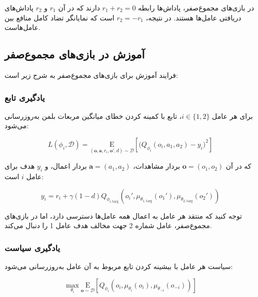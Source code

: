 در بازی‌های مجموع­‌صفر، پاداش‌ها رابطه $r_1 + r_2 = 0$ دارند که در آن $r_1$ و $r_2$ پاداش‌های دریافتی عامل‌ها هستند. در نتیجه، $r_2 = -r_1$ است که نمایانگر تضاد کامل منافع بین عامل‌هاست.

\subsection{آموزش  در بازی‌های مجموع­‌صفر}

فرایند آموزش  برای بازی‌های مجموع­‌صفر به شرح زیر است:

\subsubsection{یادگیری تابع }

برای هر عامل $i \in \{1, 2\}$، تابع  با کمینه کردن خطای میانگین مربعات بلمن به‌روزرسانی می‌شود:

\begin{equation}
    L(\phi_i, \mathcal{D}) = \underset{(\boldsymbol{o}, \boldsymbol{a}, r_i, \boldsymbol{o}', d) \sim \mathcal{D}}{\mathrm{E}}\left[ 
    \Bigg( Q_{\phi_i}(o_i, a_1, a_2) - y_i \Bigg)^2
    \right]
\end{equation}

که در آن $\boldsymbol{o} = (o_1, o_2)$ بردار مشاهدات، $\boldsymbol{a} = (a_1, a_2)$ بردار اعمال، و $y_i$ هدف برای عامل $i$ است:

\begin{equation}
    y_i = r_i + \gamma (1 - d) Q_{\phi_{i,\text{targ}}}(o_i', \mu_{\theta_{1,\text{targ}}}(o_1'), \mu_{\theta_{2,\text{targ}}}(o_2'))
\end{equation}

توجه کنید که منتقد هر عامل به اعمال همه عامل‌ها دسترسی دارد، اما در بازی‌های مجموع­‌صفر، عامل شماره 2 جهت مخالف هدف عامل 1 را دنبال می‌کند.

\subsubsection{یادگیری سیاست}

سیاست هر عامل با بیشینه کردن تابع  مربوط به آن عامل به‌روزرسانی می‌شود:

\begin{equation}
    \max_{\theta_i} \underset{\boldsymbol{o} \sim \mathcal{D}}{\mathrm{E}}\left[ Q_{\phi_i}(o_i, \mu_{\theta_i}(o_i), \mu_{\theta_{-i}}(o_{-i})) \right]
\end{equation}

